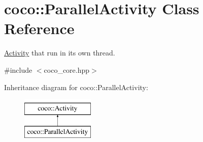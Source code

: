 \hypertarget{classcoco_1_1_parallel_activity}{}\section{coco\+:\+:Parallel\+Activity Class Reference}
\label{classcoco_1_1_parallel_activity}


\hyperlink{classcoco_1_1_activity}{Activity} that run in its own thread.  




{\ttfamily \#include $<$coco\+\_\+core.\+hpp$>$}

Inheritance diagram for coco\+:\+:Parallel\+Activity\+:\begin{figure}[H]
\begin{center}
\leavevmode
\includegraphics[height=2.000000cm]{classcoco_1_1_parallel_activity}
\end{center}
\end{figure}

